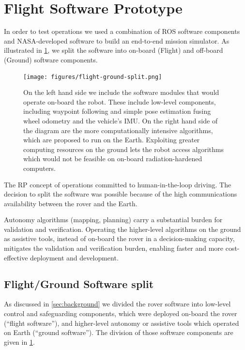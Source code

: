 \documentclass[twocolumn,letterpaper]{IEEEAerospaceCLS}  %
\begin{document}
\section{Flight Software Prototype}

In order to test operations we used a combination of ROS software components and NASA-developed software to build an end-to-end mission simulator.  As illustrated in \cref{fig:rp-software}, we split the software into on-board (Flight) and off-board (Ground) software components.  

\begin{figure}
\centering
\texttt{[image: figures/flight-ground-split.png]}
\caption{On the left hand side we include the software modules that would operate on-board the robot.  These include low-level components, including waypoint following and simple pose estimation fusing wheel odometry and the vehicle's IMU.  
On the right hand side of the diagram are the more computationally intensive algorithms, which are proposed to run on the Earth.  Exploiting greater computing resources on the ground lets the robot access algorithms which would not be feasible on on-board radiation-hardened computers. \label{fig:rp-software}}
\end{figure}

The RP concept of operations committed to human-in-the-loop driving.  The decision to split the software was possible because of the high communications availability between the rover and the Earth.  

Autonomy algorithms (mapping, planning) carry a substantial burden for validation and verification. Operating the higher-level algorithms on the ground as assistive tools, instead of on-board the rover in a decision-making capacity, mitigates the validation and verification burden, enabling faster and more cost-effective deployment and development.


\subsection{Flight/Ground Software split}

As discussed in \cref{sec:background} we divided the rover software into low-level control and safeguarding components, which were deployed on-board the rover (``flight software''), and higher-level autonomy or assistive tools which operated on Earth (``ground software'').  
The division of those software components are given in \cref{fig:rp-software}.   
\end{document}
